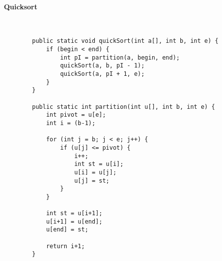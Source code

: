 \documentclass[./entry.tex]{subfiles}
\begin{document}
    \paragraph{Quicksort} \mbox{}\\
    \begin{lstlisting}
        public static void quickSort(int a[], int b, int e) {
            if (begin < end) {
                int pI = partition(a, begin, end);
                quickSort(a, b, pI - 1);
                quickSort(a, pI + 1, e);
            }
        }

        public static int partition(int u[], int b, int e) {
            int pivot = u[e];
            int i = (b-1);

            for (int j = b; j < e; j++) {
                if (u[j] <= pivot) {
                    i++;
                    int st = u[i];
                    u[i] = u[j];
                    u[j] = st;
                }
            }

            int st = u[i+1];
            u[i+1] = u[end];
            u[end] = st;

            return i+1;
        }


    \end{lstlisting}
\end{document}
